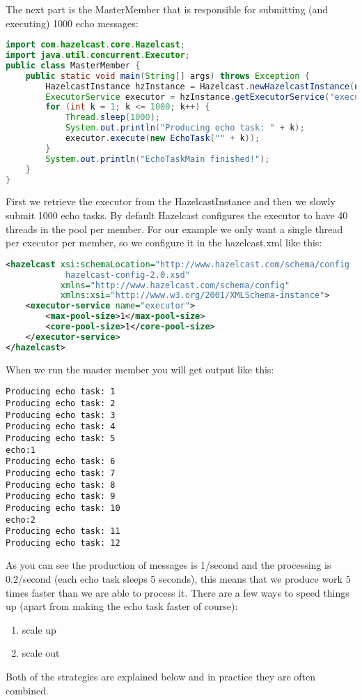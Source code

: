 The next part is the MasterMember that is responsible for submitting (and executing) 1000 echo messages:
\begin{lstlisting}[language=java]
import com.hazelcast.core.Hazelcast;
import java.util.concurrent.Executor;
public class MasterMember {
    public static void main(String[] args) throws Exception {
        HazelcastInstance hzInstance = Hazelcast.newHazelcastInstance(null);
        ExecutorService executor = hzInstance.getExecutorService("executor");
        for (int k = 1; k <= 1000; k++) {
            Thread.sleep(1000);
            System.out.println("Producing echo task: " + k);
            executor.execute(new EchoTask("" + k));
        }
        System.out.println("EchoTaskMain finished!");
    }
}
\end{lstlisting}
First we retrieve the executor from the HazelcastInstance and then we slowly submit 1000 echo tasks. By default Hazelcast configures the executor to have 40 threads in the pool per member. For our example we only want a single thread per executor per member, so we configure it in the hazelcast.xml like this:
\begin{lstlisting}[language=xml]
<hazelcast xsi:schemaLocation="http://www.hazelcast.com/schema/config
            hazelcast-config-2.0.xsd"
           xmlns="http://www.hazelcast.com/schema/config"
           xmlns:xsi="http://www.w3.org/2001/XMLSchema-instance">
    <executor-service name="executor">
        <max-pool-size>1</max-pool-size>
        <core-pool-size>1</core-pool-size>
    </executor-service>
</hazelcast>
\end{lstlisting}

When we run the master member you will get output like this:
\begin{lstlisting}
Producing echo task: 1
Producing echo task: 2
Producing echo task: 3
Producing echo task: 4
Producing echo task: 5
echo:1
Producing echo task: 6
Producing echo task: 7
Producing echo task: 8
Producing echo task: 9
Producing echo task: 10
echo:2
Producing echo task: 11
Producing echo task: 12	
\end{lstlisting}

As you can see the production of messages is 1/second and the processing is 0.2/second (each echo task sleeps 5 seconds), this means that we produce work 5 times faster than we are able to process it. There are a few ways to speed things up (apart from making the echo task faster of course):
\begin{enumerate}
\item scale up 
\item scale out
\end{enumerate}
Both of the strategies are explained below and in practice they are often combined. 

